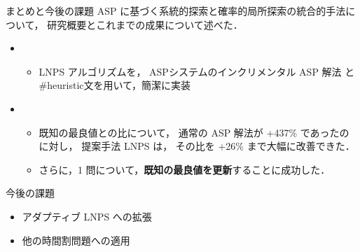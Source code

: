 \documentclass[11pt,dvipdfmx]{beamer}
\begin{document}
\begin{frame}{まとめと今後の課題}
  ASP に基づく系統的探索と確率的局所探索の統合的手法について，
  研究概要とこれまでの成果について述べた．

  \begin{itemize}
    \item {}
      \begin{itemize}
      \item LNPS アルゴリズムを，
        ASPシステム{\clingo}のインクリメンタル ASP 解法
        と\textsf{\#heuristic}文を用いて，簡潔に実装
      \end{itemize}
    \item {}
      \begin{itemize}
      \item 既知の最良値との比について，
      通常の ASP 解法が +437\% であったのに対し，
      提案手法 LNPS は，
      その比を +26\% まで大幅に改善できた．
      \item さらに，1 問について，\alert{\bf 既知の最良値を更新}することに成功した．
      \end{itemize}
    \end{itemize}

\begin{alertblock}{今後の課題}
  \begin{itemize}
  \item アダプティブ LNPS への拡張
  \item 他の時間割問題への適用
  \end{itemize}
\end{alertblock}
\end{frame}
\end{document}
